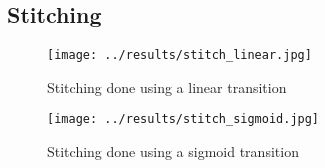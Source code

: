 \subsection{Stitching}

\begin{figure}[H]
  \centering
  \texttt{[image: ../results/stitch\_linear.jpg]}
  \caption{Stitching done using a linear transition}
  \label{fig:results:stitching:linear}
\end{figure}

\begin{figure}[H]
  \centering
  \texttt{[image: ../results/stitch\_sigmoid.jpg]}
  \caption{Stitching done using a sigmoid transition}
  \label{fig:results:stitching:sigmoid}
\end{figure}
